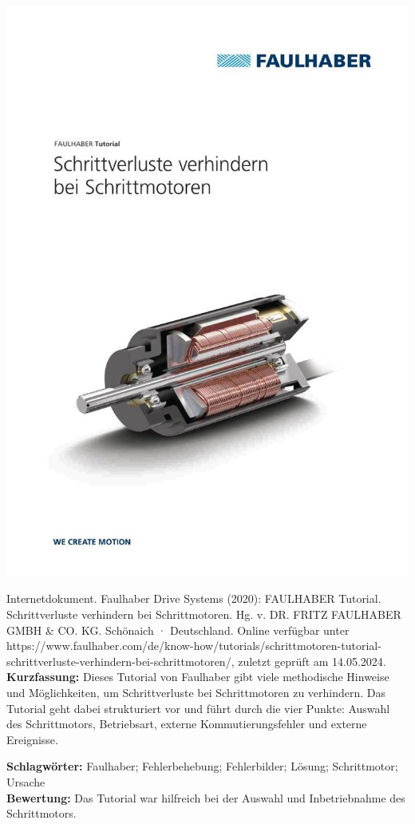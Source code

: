 {
\begin{minipage}{0.38\textwidth}
	\includegraphics[width=\linewidth]{images/Faulhaber.jpg}
\end{minipage}
\hfill
\begin{minipage}{0.6\textwidth}
Internetdokument. Faulhaber Drive Systems (2020):
FAULHABER Tutorial. Schrittverluste verhindern bei Schrittmotoren.
Hg. v. DR. FRITZ FAULHABER GMBH \& CO. KG. Schönaich · Deutschland. Online verfügbar unter https://www.faulhaber.com/de/know-how/tutorials/schrittmotoren-tutorial-schrittverluste-verhindern-bei-schrittmotoren/, zuletzt geprüft am 14.05.2024.
\\ \textbf{Kurzfassung:}
Dieses Tutorial von Faulhaber gibt viele methodische Hinweise und Möglichkeiten, um Schrittverluste bei Schrittmotoren zu verhindern. Das Tutorial geht dabei strukturiert vor und führt durch die vier Punkte: Auswahl des Schrittmotors, Betriebsart, externe Kommutierungsfehler und externe Ereignisse.
\end{minipage}
\textbf{Schlagwörter:}
Faulhaber; Fehlerbehebung; Fehlerbilder; Lösung; Schrittmotor; Ursache
\\ \textbf{Bewertung:}
Das Tutorial war hilfreich bei der Auswahl und Inbetriebnahme des  Schrittmotors.
}

